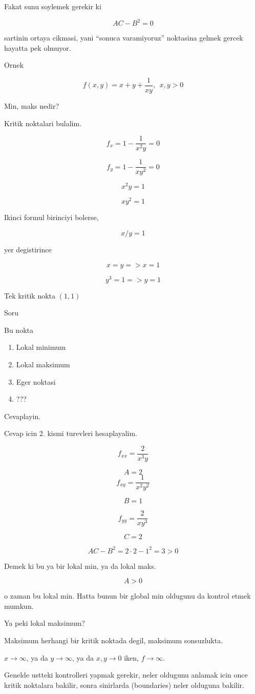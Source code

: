 \documentclass[12pt,fleqn]{article}
\begin{document}
Fakat sunu soylemek gerekir ki 

\[ AC - B^2 = 0 \]

sartinin ortaya cikmasi, yani ``sonuca varamiyoruz'' noktasina gelmek
gercek hayatta pek olmuyor. 

Ornek

\[ f(x,y)= x + y + \frac{1}{xy}, \ \ x,y > 0 \]

Min, maks nedir? 

Kritik noktalari bulalim. 

\[ f_x = 1 - \frac{1}{x^2y} = 0\]

\[ f_y = 1 - \frac{1}{xy^2} = 0\]

\[ x^2y = 1 \]

\[ xy^2 = 1 \]

Ikinci formul birinciyi bolerse, 

\[ x/y = 1 \]

yer degistirince

\[ x = y => x = 1 \]

\[ y^3 = 1 => y = 1 \]

Tek kritik nokta $(1,1)$

Soru

Bu nokta 

\begin{enumerate}
   \item Lokal minimum
   \item Lokal maksimum
   \item Eger noktasi
   \item ???
\end{enumerate}

Cevaplayin. 

Cevap icin 2. kismi turevleri hesaplayalim. 

\[ f_{xx} = \frac{2}{x^3y} \]

\[  A = 2 \]
\[ f_{xy} = \frac{1}{x^2y^2} \]

\[ B = 1 \]

\[ f_{yy} = \frac{2}{xy^3} \]

\[ C = 2 \]

\[ AC - B^2 = 2 \cdot 2 - 1^2 = 3 > 0 \]

Demek ki bu ya bir lokal min, ya da lokal maks. 

\[ A > 0 \]

o zaman bu lokal min. Hatta bunun bir global min oldugunu da kontrol etmek
mumkun. 

Ya peki lokal maksimum? 

Maksimum herhangi bir kritik noktada degil, maksimum sonsuzlukta. 

$x \to \infty$, ya da $y \to \infty$, ya da $x,y \to 0$ iken, $f \to
\infty$. 

Genelde ustteki kontrolleri yapmak gerekir, neler oldugunu anlamak icin
once kritik noktalara bakilir, sonra sinirlarda (boundaries) neler olduguna
bakilir.
\end{document}
